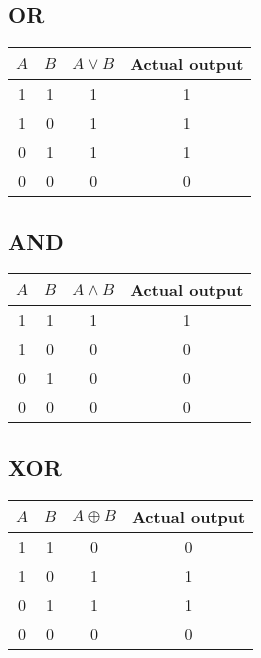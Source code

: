 \documentclass[11pt,a4paper]{article}
\begin{document}

\subsection*{OR} %
\label{sub:OR}

\begin{table}[htb!]
    \centering
    \begin{tabular}{c | c || c || c}
        $A$ & $B$ & $A \lor B$ & Actual output \\ \hline
        1   & 1   & 1          & 1        \\
        1   & 0   & 1          & 1        \\
        0   & 1   & 1          & 1        \\
        0   & 0   & 0          & 0        \\
    \end{tabular}
\end{table}


\subsection*{AND} %
\label{sub:AND}

\begin{table}[htb!]
    \centering
    \begin{tabular}{c | c || c || c}
        $A$ & $B$ & $A \land B$ & Actual output \\ \hline
        1 & 1 & 1                & 1        \\
        1 & 0 & 0                & 0        \\
        0 & 1 & 0                & 0        \\
        0 & 0 & 0                & 0        \\
    \end{tabular}
\end{table}

\newpage
\subsection*{XOR} %
\label{sub:XOR}

\begin{table}[htb!]
    \centering
    \begin{tabular}{c | c || c || c}
        $A$ & $B$ & $A \oplus B$ & Actual output \\ \hline
        1 & 1 & 0                & 0        \\
        1 & 0 & 1                & 1        \\
        0 & 1 & 1                & 1        \\
        0 & 0 & 0                & 0        \\
    \end{tabular}
\end{table}
\end{document}
